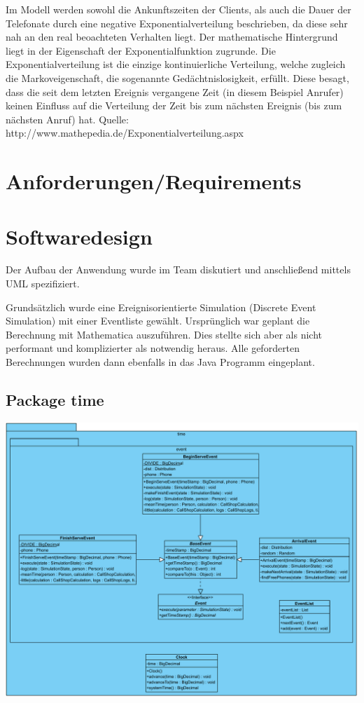 Im Modell werden sowohl die Ankunftszeiten der Clients, als auch die Dauer der Telefonate durch eine negative Exponentialverteilung beschrieben, da diese sehr nah an den real beoachteten Verhalten liegt. Der mathematische Hintergrund liegt in der Eigenschaft der Exponentialfunktion zugrunde. Die Exponentialverteilung ist die einzige kontinuierliche Verteilung, welche zugleich die Markoveigenschaft, die sogenannte Gedächtnislosigkeit, erfüllt. Diese besagt, dass die seit dem letzten Ereignis vergangene Zeit (in diesem Beispiel Anrufer) keinen Einfluss auf die Verteilung der Zeit bis zum nächsten Ereignis (bis zum nächsten Anruf) hat. 
Quelle: http://www.mathepedia.de/Exponentialverteilung.aspx


\section{Anforderungen/Requirements}

\section{Softwaredesign}

Der Aufbau der Anwendung wurde im Team diskutiert und anschließend mittels UML spezifiziert.

Grundsätzlich wurde eine Ereignisorientierte Simulation (Discrete Event Simulation) mit einer Eventliste gewählt. Ursprünglich war geplant die Berechnung mit Mathematica auszuführen. Dies stellte sich aber als nicht performant und komplizierter als notwendig heraus. Alle geforderten Berechnungen wurden dann ebenfalls in das Java Programm eingeplant.

\subsection{Package time}

\includegraphics[scale=0.5]{abbildungen/uml/time.pdf}

